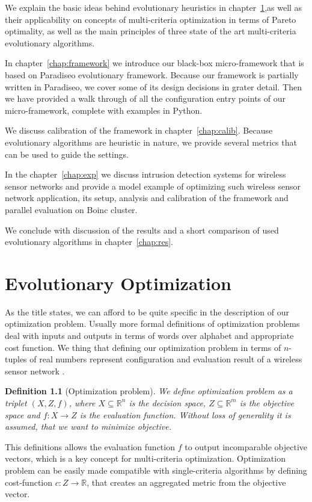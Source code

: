 \documentclass[12pt,oneside]{fithesis2}
\newtheorem{defn}{Definition}
\begin{document}
We explain the basic ideas behind evolutionary heuristics in chapter~\ref{chap:evolution},as well as their applicability on concepts of multi-criteria optimization in terms of Pareto optimality, as well as the main principles of three state of the art multi-criteria evolutionary algorithms. 

In chapter~\ref{chap:framework} we introduce our black-box micro-framework that is based on Paradiseo evolutionary framework. Because our framework is partially written in Paradiseo, we cover some of its design decisions in grater detail. Then we have provided a walk through of all the configuration entry points of our micro-framework, complete with examples in Python.

We discuss calibration of the framework in chapter~\ref{chap:calib}. Because evolutionary algorithms are heuristic in nature, we provide several metrics that can be used to guide the settings. 

In the chapter~\ref{chap:exp} we discuss intrusion detection systems for wireless sensor networks and provide a model example of optimizing such wireless sensor network application, its setup, analysis and calibration of the framework and parallel evaluation on Boinc cluster.

We conclude with discussion of the results and a short comparison of used evolutionary algorithms in chapter~\ref{chap:res}.

\chapter{Evolutionary Optimization}
\label{chap:evolution}
As the title states, we can afford to be quite specific in the description of our optimization problem. Usually more formal definitions of optimization problems deal with inputs and outputs in terms of words over alphabet and appropriate cost function. We thing that defining our optimization problem in terms of $n$-tuples of real numbers represent configuration and evaluation result of a wireless sensor network . 

\begin{defn}[Optimization problem]
We define optimization problem as a triplet $(X,Z,f)$,
 where $X \subseteq \mathbb{R}^n$ is the decision space,
$Z \subseteq \mathbb{R}^m$ is the objective space and $f:X \to Z$ is the evaluation function.
Without loss of generality it is assumed, that we want to minimize objective.
\end{defn}

This definitions allows the evaluation function $f$ to output incomparable objective vectors, which is a key concept for multi-criteria optimization. Optimization problem can be easily made compatible with single-criteria algorithms by defining cost-function $c:Z \to \mathbb{R}$, that creates an aggregated metric from the objective vector.
\end{document}
